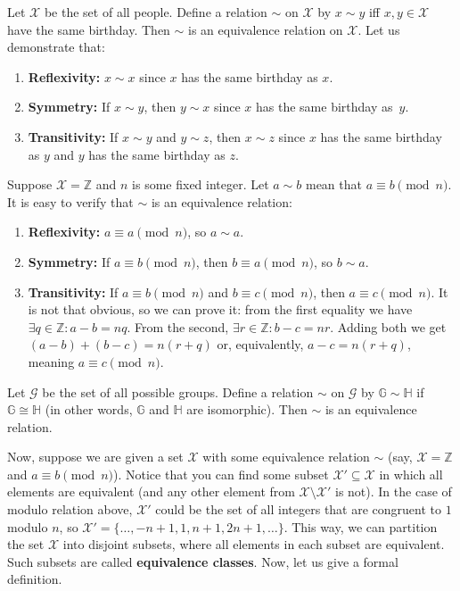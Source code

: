 \documentclass[../../book.tex]{subfiles}
\begin{document}
\begin{example}
    Let $\mathcal{X}$ be the set of all people. Define a relation $\sim$ on $\mathcal{X}$ by $x \sim y$ iff $x,y \in \mathcal{X}$ have the same birthday. 
    Then $\sim$ is an equivalence relation on $\mathcal{X}$. Let us demonstrate that:
    \begin{enumerate}
        \item \textbf{Reflexivity:} $x \sim x$ since $x$ has the same birthday as $x$.
        \item \textbf{Symmetry:} If $x \sim y$, then $y \sim x$ since $x$ has the same birthday as~$y$.
        \item \textbf{Transitivity:} If $x \sim y$ and $y \sim z$, then $x \sim z$ since $x$ has the same birthday as $y$ and $y$ has the same birthday as $z$.
    \end{enumerate}
\end{example}

\begin{example}
    Suppose $\mathcal{X} = \mathbb{Z}$ and $n$ is some fixed integer. Let $a \sim b$ mean that $a \equiv b \pmod{n}$. It is easy to verify that $\sim$ is an equivalence relation:
    \begin{enumerate}
        \item \textbf{Reflexivity:} $a \equiv a \pmod{n}$, so $a \sim a$.
        \item \textbf{Symmetry:} If $a \equiv b \pmod{n}$, then $b \equiv a \pmod{n}$, so $b \sim a$.
        \item \textbf{Transitivity:} If $a \equiv b \pmod{n}$ and $b \equiv c \pmod{n}$, then $a \equiv c \pmod{n}$. It is not that obvious, so we can prove it: from the first equality we have $\exists q \in \mathbb{Z}: a-b = nq$. From the second, $\exists r \in \mathbb{Z}: b-c = nr$. Adding both we get $(a-b)+(b-c) = n(r+q)$ or, equivalently, $a-c = n(r+q)$, meaning $a \equiv c \pmod{n}$.
    \end{enumerate}
\end{example}

\begin{example}
    Let $\mathcal{G}$ be the set of all possible groups. Define a relation $\sim$ on $\mathcal{G}$ by $\mathbb{G} \sim \mathbb{H}$ if $\mathbb{G} \cong \mathbb{H}$ (in other words, $\mathbb{G}$ and $\mathbb{H}$ are isomorphic). Then $\sim$ is an equivalence relation.
\end{example}

Now, suppose we are given a set $\mathcal{X}$ with some equivalence relation $\sim$ (say, $\mathcal{X} = \mathbb{Z}$ and $a \equiv b \pmod{n}$). Notice that you can find some subset $\mathcal{X}' \subseteq \mathcal{X}$ in which all elements are equivalent (and any other element from $\mathcal{X} \setminus \mathcal{X}'$ is not). In the case of modulo relation above, $\mathcal{X}'$ could be the set of all integers that are congruent to $1$ modulo $n$, so $\mathcal{X}' = \{\dots,-n+1,1,n+1,2n+1,\dots\}$. This way, we can partition the set $\mathcal{X}$ into disjoint subsets, where all elements in each subset are equivalent. Such subsets are called \textbf{equivalence classes}. Now, let us give a formal definition.
\end{document}
